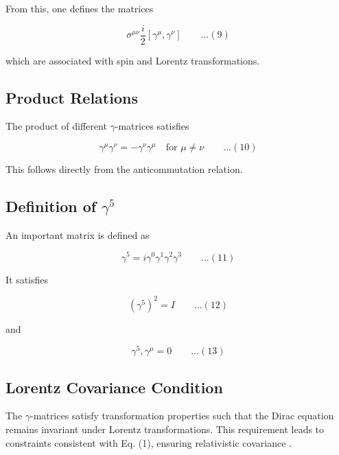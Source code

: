 \documentclass[12pt]{report}
\begin{document}
From this, one defines the matrices

\begin{equation*}
\sigma^{\mu\nu}
\frac{i}{2}[\gamma^\mu , \gamma^\nu]\qquad ...(9)
\end{equation*}

which are associated with spin and Lorentz transformations.

\subsection*{Product Relations}

The product of different $\gamma$-matrices satisfies

\begin{equation*}
\gamma^\mu \gamma^\nu = - \gamma^\nu \gamma^\mu\quad \text{for } \mu \neq \nu\qquad ...(10)
\end{equation*}

This follows directly from the anticommutation relation.

\subsection*{Definition of $\gamma^5$}

An important matrix is defined as

\begin{equation*}
\gamma^5 = i \gamma^0 \gamma^1 \gamma^2 \gamma^3\qquad ...(11)
\end{equation*}

It satisfies

\begin{equation*}
(\gamma^5)^2 = I\qquad ...(12)
\end{equation*}

and

\begin{equation*}
{ \gamma^5 , \gamma^\mu } = 0\qquad ...(13)
\end{equation*}

\subsection*{Lorentz Covariance Condition}

The $\gamma$-matrices satisfy transformation properties such that the Dirac equation remains invariant under Lorentz transformations. This requirement leads to constraints consistent with Eq. (1), ensuring relativistic covariance .
\end{document}
